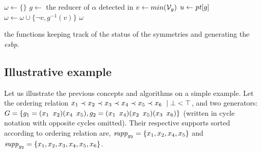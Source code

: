  \begin{algorithm}[!htbp]
  
  
  
  
  
  {
   $\omega \gets \{\}$\;
   $g \gets$ the reducer of $\alpha$ detected in \isNotMinimal\;
   $v \gets min(\mathcal{V}_g)$\;
   $u \gets \mathit{pt}[g] $\;
   $\omega \gets \omega \cup \{\neg v, g^{-1}(v)\}$\;
   \Return $\omega$
  }
  \caption{the functions keeping track of the status of the symmetries and generating the \emph{esbp}.}
  \label{algo:keep_status}
  
 \end{algorithm}%
 
 
 
 \subsection{Illustrative example}
  Let us illustrate the previous concepts and algorithms on a simple example. Let the ordering relation $x_1 \prec x_2 \prec x_3 \prec x_4
 \prec x_5 \prec x_6\ \mid \bot < \top$, and two generators:\\
 $G = \{
  g_1 = (x_1 \enskip x_2)(x_4 \enskip x_5),g_2 = (x_1 \enskip x_4)(x_2 \enskip x_5)(x_3 \enskip x_6)\}$
 (written in cycle notation with opposite cycles omitted). Their
 respective supports sorted according to ordering relation are, $\mathit{supp}_{g_{2}} = \{x_1, x_2, x_4, x_5\}$ and
 $\mathit{supp}_{g_2} = \{x_1, x_2, x_3, x_4, x_5, x_6\}$.
 

